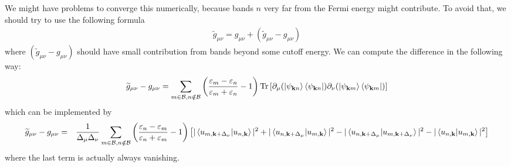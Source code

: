 \documentclass[onecolumn, prb,preprintnumbers,amsmath,amssymb,floatfix]{revtex4}
\newcommand{\vk}{{\mathbf{k}}}
\newcommand{\Tr}{\mathrm{Tr}} \newcommand{\npsi}{\underline{\psi}}
\newcommand{\cb}{{\cal B}}
\begin{document}
We might have problems to converge this numerically, because bands $n$
very far from the Fermi energy might contribute. To avoid that, we
should try to use the following formula
\begin{eqnarray}
  \widetilde{g}_{\mu\nu}= g_{\mu\nu} + (\widetilde{g}_{\mu\nu}-g_{\mu\nu})
\end{eqnarray}
where $(\widetilde{g}_{\mu\nu}-g_{\mu\nu})$ should have small
contribution from bands beyond some cutoff energy. We can compute the
difference in the following way:
\begin{eqnarray}
  \widetilde{g}_{\mu\nu}-g_{\mu\nu}=  \sum_{m\in\cb,n\notin\cb}
  \left(\frac{\varepsilon_m-\varepsilon_n}{\varepsilon_m+\varepsilon_n}-1\right)
  \Tr\left[ \partial_\mu(\ket{\psi_{\vk n}}\bra{\psi_{\vk n}})  \partial_\nu (\ket{\psi_{\vk m}}\bra{\psi_{\vk m}})
  \right]
\end{eqnarray}  
which can be implemented by
\begin{eqnarray}
  \widetilde{g}_{\mu\nu}-g_{\mu\nu}&=&
  \frac{1}{\Delta_\mu\Delta_\nu}
\sum_{m\in\cb,n\notin\cb}\left(\frac{\varepsilon_n-\varepsilon_m}{\varepsilon_n+\varepsilon_m}-1\right)
  \left[
    |\braket{u_{m,\vk+\Delta_\nu}|u_{n,\vk}}|^2
    +|\braket{u_{n,\vk+\Delta_\mu}|u_{m,\vk}}|^2
    -|\braket{u_{n,\vk+\Delta_\mu}|u_{m,\vk+\Delta_\nu}}|^2 
    -|\braket{u_{n,\vk}|u_{m,\vk}}|^2
  \right]
\nonumber
\end{eqnarray}  
where the last term is actually always vanishing.
\end{document}
